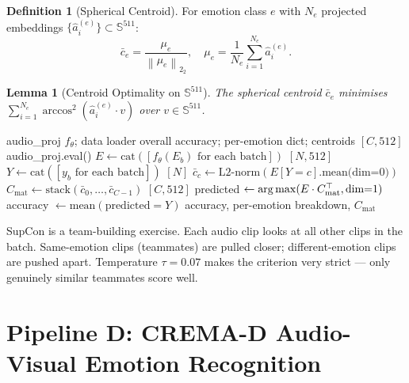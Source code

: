 \documentclass[12pt,a4paper]{article}
\theoremstyle{definition}
\newtheorem{definition}{Definition}[section]
\theoremstyle{plain}
\newtheorem{lemma}[theorem]{Lemma}
\theoremstyle{remark}
\newcommand{\Sph}{\mathbb{S}}
\newcommand{\Norm}[1]{\left\|#1\right\|_2}
\newcommand{\argmax}{\operatornamewithlimits{arg\,max}}
\begin{document}
\begin{definition}[Spherical Centroid]
For emotion class $e$ with $N_e$ projected embeddings $\{\hat{a}_i^{(e)}\} \subset \Sph^{511}$:
\[
  \bar{c}_e = \frac{\mu_e}{\Norm{\mu_e}_2}, \quad \mu_e = \frac{1}{N_e}\sum_{i=1}^{N_e}\hat{a}_i^{(e)}.
\]
\end{definition}

\begin{lemma}[Centroid Optimality on $\Sph^{511}$]
The spherical centroid $\bar{c}_e$ minimises $\sum_{i=1}^{N_e} \arccos^2(\hat{a}_i^{(e)} \cdot v)$ over $v \in \Sph^{511}$.
\end{lemma}

\begin{algorithm}[H]
\caption{Emotion Accuracy Evaluation via Centroid Nearest-Neighbour}
\label{alg:centroid_eval}
\begin{algorithmic}[1]
\Require audio\_proj $f_\theta$; data loader
\Ensure overall accuracy; per-emotion dict; centroids $[C, 512]$
\State audio\_proj.eval()
\State $E \gets \text{cat}([f_\theta(E_b) \text{ for each batch}])$ \quad $[N, 512]$
\State $Y \gets \text{cat}([y_b \text{ for each batch}])$ \quad $[N]$
  \State $\bar{c}_c \gets \text{L2-norm}(E[Y{=}c].\text{mean(dim=0)})$
\EndFor
\State $C_{\text{mat}} \gets \text{stack}(\bar{c}_0,\ldots,\bar{c}_{C-1})$ \quad $[C, 512]$
\State predicted $\gets \argmax(E \cdot C_{\text{mat}}^\top, \text{dim=1})$
\State accuracy $\gets \text{mean}(\text{predicted} = Y)$
\State \Return accuracy, per-emotion breakdown, $C_{\text{mat}}$
\end{algorithmic}
\end{algorithm}

\begin{tcolorbox}[laymanbox]
SupCon is a team-building exercise. Each audio clip looks at all other clips in the batch. Same-emotion clips (teammates) are pulled closer; different-emotion clips are pushed apart. Temperature $\tau = 0.07$ makes the criterion very strict — only genuinely similar teammates score well.
\end{tcolorbox}

\newpage
\section{Pipeline D: CREMA-D Audio-Visual Emotion Recognition}
\label{sec:pipelineD}
\end{document}
